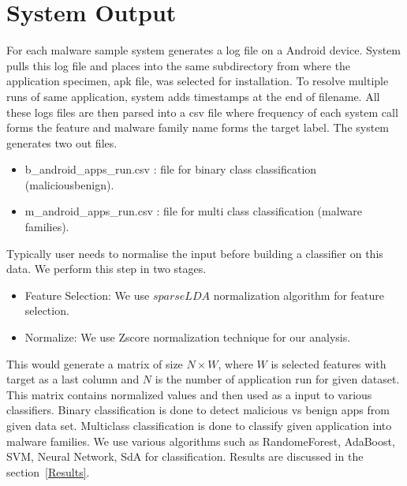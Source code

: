 \section{System Output}
\label{System Output}
For each malware sample system generates a log file on a Android device. System pulls this log file and places into the same subdirectory from where the application specimen, apk file, was selected for installation. To resolve multiple runs of same application, system adds timestamps at the end of filename. All these logs files are then parsed into a csv file where frequency of each system call forms the feature and malware family name forms the target label. The system generates two out files.
\begin{itemize}
\item b\_android\_apps\_run.csv : file for binary class classification (malicious\/benign).
\item m\_android\_apps\_run.csv : file for multi class classification (malware families).
\end{itemize}
Typically user needs to normalise the input before building a classifier on this data. We perform this step in two stages. 
\begin{itemize}
\item Feature Selection: We use $sparseLDA$ normalization algorithm for feature selection.
\item Normalize: We use Zscore normalization technique for our analysis.
\end{itemize}

This would generate a matrix of size \(N \times W\), where \(W\) is selected features with target as a last column and \(N\) is the number of application run for given dataset. This matrix contains normalized values and then used as a input to various classifiers. Binary classification is done to detect malicious vs benign apps from given data set. Multiclass classification is done to classify given application into malware families. We use various algorithms such as RandomeForest, AdaBoost, SVM, Neural Network, SdA for classification. Results are discussed in the section~\ref{Results}.
